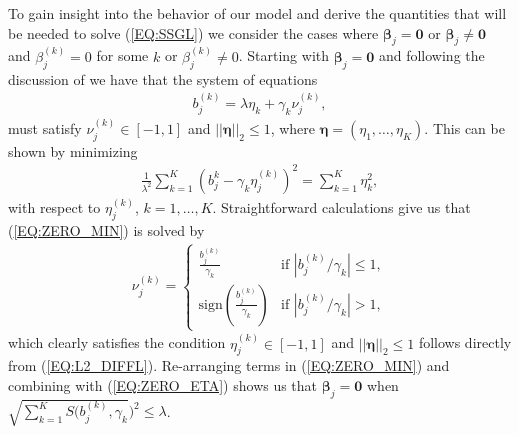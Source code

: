 \documentclass{article}
\numberwithin{equation}{section}
\theoremstyle{plain}
\newcommand{\bs}{\boldsymbol}
\begin{document}
To gain insight into the behavior of our model and derive the quantities that
will be needed to solve (\ref{EQ:SSGL}) we consider the cases where
$\bs\beta_j = \mathbf{0}$ or $\bs\beta_j \neq \mathbf{0}$ and $\beta_j^{(k)} =
0$ for some $k$ or $\beta_j^{(k)} \neq 0$.
Starting with $\bs\beta_j = \mathbf{0}$ and following the discussion of
\cite{friedman2010note} we have that the system of equations
\begin{align}
\label{EQ:ZERO}
b_j^{(k)} 
 = 
\lambda \eta_k + \gamma_k \nu_j^{(k)},
\end{align}
\noindent must 
satisfy $\nu_j^{(k)} \in [-1, 1]$ and $||\bs\eta||_2 \leq
1$, where $\bs\eta = (\eta_1, \ldots, \eta_K)$. This can be shown by minimizing 
\begin{align}
\label{EQ:ZERO_MIN}
\frac{1}{\lambda^2} \sum_{k = 1}^K (b_j^{k} - \gamma_k
\eta_j^{(k)})^2 = \sum_{k = 1}^K \eta_k^2,
\end{align}
\noindent with respect to $\eta_j^{(k)}$, $k = 1,\ldots,K$. Straightforward
calculations give us that (\ref{EQ:ZERO_MIN}) is solved by
\begin{align}
\label{EQ:ZERO_ETA}
\nu_j^{(k)} =
\left\{
\begin{array}{ll}
\frac{b_j^{(k)}}{\gamma_k} & \mbox{if } |b_j^{(k)}/\gamma_k| \leq 1, \\
\mbox{sign}\left(\frac{b_j^{(k)}}{\gamma_k}\right) & \mbox{if }
|b_j^{(k)}/\gamma_k| > 1,
\end{array}
\right.
\end{align}
\noindent which clearly satisfies the condition $\eta_j^{(k)} \in [-1, 1]$ and
$||\bs\eta||_2 \leq 1$ follows directly from (\ref{EQ:L2_DIFFL}). Re-arranging
terms in (\ref{EQ:ZERO_MIN}) and combining with (\ref{EQ:ZERO_ETA}) shows us
that $\bs\beta_j = \mathbf{0}$ when $\sqrt{\sum_{k = 1}^K S(b_j^{(k)},
\gamma_k})^2 \leq \lambda$.
\end{document}
